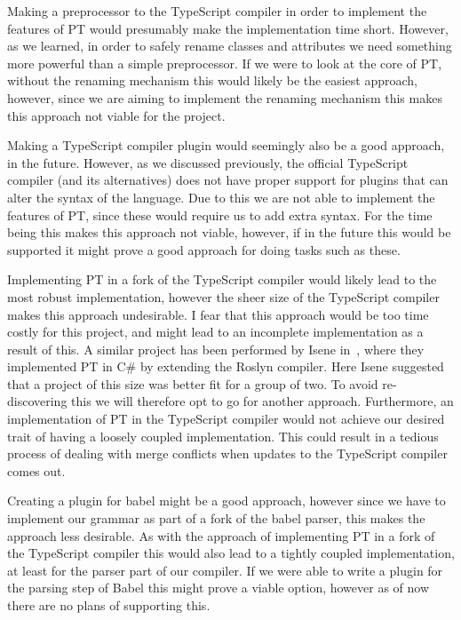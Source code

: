 Making a preprocessor to the TypeScript compiler in order to implement the features of PT would presumably make the implementation time short.
However, as we learned, in order to safely rename classes and attributes we need something more powerful than a simple preprocessor.
If we were to look at the core of PT, without the renaming mechanism this would likely be the easiest approach, however, since we are aiming to implement the renaming mechanism this makes this approach not viable for the project.

Making a TypeScript compiler plugin would seemingly also be a good approach, in the future.
However, as we discussed previously, the official TypeScript compiler (and its alternatives) does not have proper support for plugins that can alter the syntax of the language.
Due to this we are not able to implement the features of PT, since these would require us to add extra syntax.
For the time being this makes this approach not viable, however, if in the future this would be supported it might prove a good approach for doing tasks such as these.

Implementing PT in a fork of the TypeScript compiler would likely lead to the most robust implementation, however the sheer size of the TypeScript compiler makes this approach undesirable.
I fear that this approach would be too time costly for this project, and might lead to an incomplete implementation as a result of this.
A similar project has been performed by Isene in~\cite{Isene2018}, where they implemented PT in C\# by extending the Roslyn compiler.
Here Isene suggested that a project of this size was better fit for a group of two.
To avoid re-discovering this we will therefore opt to go for another approach.
Furthermore, an implementation of PT in the TypeScript compiler would not achieve our desired trait of having a loosely coupled implementation.
This could result in a tedious process of dealing with merge conflicts when updates to the TypeScript compiler comes out.

Creating a plugin for babel might be a good approach, however since we have to implement our grammar as part of a fork of the babel parser, this makes the approach less desirable.
As with the approach of implementing PT in a fork of the TypeScript compiler this would also lead to a tightly coupled implementation, at least for the parser part of our compiler.
If we were able to write a plugin for the parsing step of Babel this might prove a viable option, however as of now there are no plans of supporting this.

